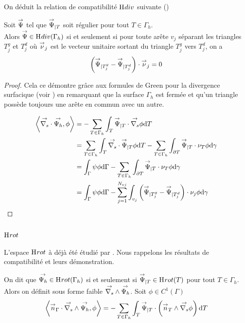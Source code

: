On déduit la relation de compatibilité \(\mathrm{H}_\mathrm{{}}{div}\) suivante (\cite[Lemme.~8]{nedelec_mixed_1980})
\begin{prop}
    \label{prop:annex:hdiv_hrot:hdiv}
    Soit \({\overset{\rightarrow}{\Psi}}\) tel que \({\overset{\rightarrow}{\Psi}}_{|T}\) soit régulier pour tout \(T\in\Gamma_h\).\\
    Alors \({\overset{\rightarrow}{\Psi}} \in \mathrm{H}_\mathrm{{}}{div}(\Gamma_h)\) si et seulement si pour toute arête \(v_j\) séparant les triangles \(T_j^g\) et \(T_j^d\) où \({\overset{\rightarrow}{\nu}}_j\) est le vecteur unitaire sortant du triangle \(T_j^g\) vers \(T_j^d\), on a
    \begin{equation}
        \left( {\overset{\rightarrow}{\Psi}}_{|T_j^g} - {\overset{\rightarrow}{\Psi}}_{|T_j^d} \right ) \cdot {\overset{\rightarrow}{\nu}}_j = 0
    \end{equation}
\end{prop}

\begin{proof}
    Cela ce démontre grâce aux formules de Green pour la divergence surfacique (voir \cite[eq.~(A3.47)]{bladel_electromagnetic_2007}) en remarquant que la surface \(\Gamma_h\) est fermée et qu'un triangle possède toujours une arête en commun avec un autre.

    \begin{align}
    \left< {\overset{\rightarrow}{\nabla_s}} \cdot {\overset{\rightarrow}{\Psi_h}}, \phi \right>
    & = - \sum_{T\in\Gamma_h} \int_T {\overset{\rightarrow}{\Psi}}_{|T} \cdot {\overset{\rightarrow}{\nabla_s}} \phi\mathrm{d}{T} \\
    & = \sum_{T\in\Gamma_h} \int_T {\overset{\rightarrow}{\nabla_s}} \cdot {\overset{\rightarrow}{\Psi}}_{|T} \phi \mathrm{d}{T} - \sum_{T\in\Gamma_h} \int_{\partial T} {\overset{\rightarrow}{\Psi}}_{|T} \cdot \nu_T \phi \mathrm{d}{\gamma} \\
    & = \int_\Gamma \psi \phi \mathrm{d}{\Gamma} - \sum_{T\in\Gamma_h} \int_{\partial T} {\overset{\rightarrow}{\Psi}}_{|T} \cdot \nu_T \phi \mathrm{d}{\gamma} \\
    & = \int_\Gamma \psi \phi \mathrm{d}{\Gamma} - \sum_{j=1}^{N_{vj}} \int_{v_j} \left( {\overset{\rightarrow}{\Psi}}_{|T_j^g} - {\overset{\rightarrow}{\Psi}}_{|T_j^d} \right) \cdot \nu_j \phi \mathrm{d}{\gamma}
    \end{align}
\end{proof}

\subsection[Hrot]{\(\mathrm{H}_\mathrm{{}}{rot}\)}

L'espace \(\mathrm{H}_\mathrm{{}}{rot}\) à déjà été étudié par \cite[Lemme.~ 6]{nedelec_mixed_1980}. Nous rappelons les résultats de compatibilité et leurs démonstration.

\begin{defn}
    On dit que \({\overset{\rightarrow}{\Psi_h}} \in \mathrm{H}_\mathrm{{}}{rot}(\Gamma_h)\) si et seulement si \({\overset{\rightarrow}{\Psi}}_{|T} \in \mathrm{H}_\mathrm{{}}{rot}(T)\) pour tout \(T \in \Gamma_h\).\\
    Alors on définit sous forme faible \({\overset{\rightarrow}{\nabla_s}} \wedge {\overset{\rightarrow}{\Psi_h}} \).
    Soit \(\phi \in C^1(\Gamma)\)
    \begin{equation}
        \left< \vn_\Gamma \cdot \vrots \vect{\Psi_h}, \phi \right> %
        = - \sum_{T\in\Gamma_h} \int_T \vect{\Psi}_{|T}  \cdot \left( \vn_T \pvect \vgrads \phi \right) \dd{T}
    \end{equation}
\end{defn}


